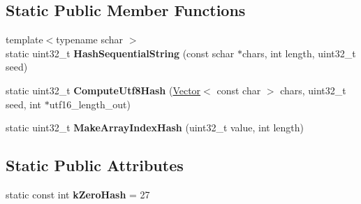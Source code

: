\subsection*{Static Public Member Functions}
\begin{DoxyCompactItemize}
\item 
{\footnotesize template$<$typename schar $>$ }\\static uint32\+\_\+t {\bfseries Hash\+Sequential\+String} (const schar $\ast$chars, int length, uint32\+\_\+t seed)\hypertarget{classv8_1_1internal_1_1_string_hasher_af383d0048c55829db62e36cdcbeaaf2d}{}\label{classv8_1_1internal_1_1_string_hasher_af383d0048c55829db62e36cdcbeaaf2d}

\item 
static uint32\+\_\+t {\bfseries Compute\+Utf8\+Hash} (\hyperlink{classv8_1_1internal_1_1_vector}{Vector}$<$ const char $>$ chars, uint32\+\_\+t seed, int $\ast$utf16\+\_\+length\+\_\+out)\hypertarget{classv8_1_1internal_1_1_string_hasher_a7a7b5ead06159017190235d8b18c834c}{}\label{classv8_1_1internal_1_1_string_hasher_a7a7b5ead06159017190235d8b18c834c}

\item 
static uint32\+\_\+t {\bfseries Make\+Array\+Index\+Hash} (uint32\+\_\+t value, int length)\hypertarget{classv8_1_1internal_1_1_string_hasher_aa478bc40298c8bd5f5478b40fa444c10}{}\label{classv8_1_1internal_1_1_string_hasher_aa478bc40298c8bd5f5478b40fa444c10}

\end{DoxyCompactItemize}
\subsection*{Static Public Attributes}
\begin{DoxyCompactItemize}
\item 
static const int {\bfseries k\+Zero\+Hash} = 27\hypertarget{classv8_1_1internal_1_1_string_hasher_ae0e5f2b5dc2ba3f181591f7b63f9149b}{}\label{classv8_1_1internal_1_1_string_hasher_ae0e5f2b5dc2ba3f181591f7b63f9149b}

\end{DoxyCompactItemize}
